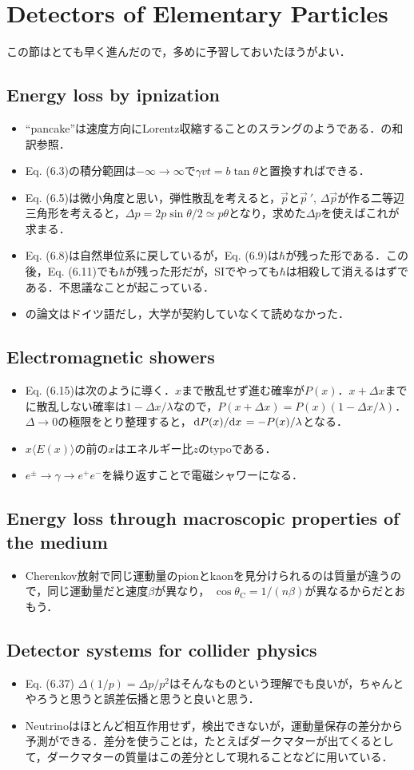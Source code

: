 \section{Detectors of Elementary Particles}
この節はとても早く進んだので，多めに予習しておいたほうがよい．
\subsection{Energy loss by ipnization}
\begin{itemize}
		\item ``pancake''は速度方向にLorentz収縮することのスラングのようである．\cite{Pes:2022}の和訳参照．
		\item Eq. (6.3)の積分範囲は$-\infty \to \infty$で$\gamma vt = b\tan\theta $と置換すればできる．
		\item Eq. (6.5)は微小角度と思い，弾性散乱を考えると，$\vec{p} $と$\vec{p}\ \!'$, $\varDelta \vec{p} $が作る二等辺三角形を考えると，$\varDelta p = 2p\sin\theta/2\simeq p\theta$となり，求めた$\varDelta p $を使えばこれが求まる．
		\item Eq. (6.8)は自然単位系に戻しているが，Eq. (6.9)は$\hbar $が残った形である．この後，Eq. (6.11)でも$\hbar $が残った形だが，SIでやっても$\hbar $は相殺して消えるはずである．不思議なことが起こっている．
		\item \cite{Bethe1930}の論文はドイツ語だし，大学が契約していなくて読めなかった．
\end{itemize}
\subsection{Electromagnetic showers}
\begin{itemize}
		\item Eq. (6.15)は次のように導く．$x $まで散乱せず進む確率が$P(x) $．$x + \varDelta x $までに散乱しない確率は$1-\varDelta x /\lambda$なので，$P(x + \varDelta x) = P(x)(1-\varDelta x/\lambda) $．$\varDelta \to 0 $の極限をとり整理すると，$\dv*{P(x)}{x} = -P(x)/\lambda $となる．
		\item $x\langle E(x)\rangle $の前の$x $はエネルギー比$z $のtypoである．
		\item $e^{\pm} \to \gamma \to e^{+}e^{-} $を繰り返すことで電磁シャワーになる．
\end{itemize}
\subsection{Energy loss through macroscopic properties of the medium}
\begin{itemize}
		\item Cherenkov放射で同じ運動量のpionとkaonを見分けられるのは質量が違うので，同じ運動量だと速度$\beta $が異なり，
				$\cos\theta_{\text{C}}= 1/(n\beta) $が異なるからだとおもう．
\end{itemize}
\subsection{Detector systems for collider physics}
\begin{itemize}
		\item Eq. (6.37) $\varDelta (1/p) = \varDelta p/p^2 $はそんなものという理解でも良いが，ちゃんとやろうと思うと誤差伝播と思うと良いと思う．
		\item Neutrinoはほとんど相互作用せず，検出できないが，運動量保存の差分から予測ができる．差分を使うことは，たとえばダークマターが出てくるとして，ダークマターの質量はこの差分として現れることなどに用いている．
\end{itemize}
